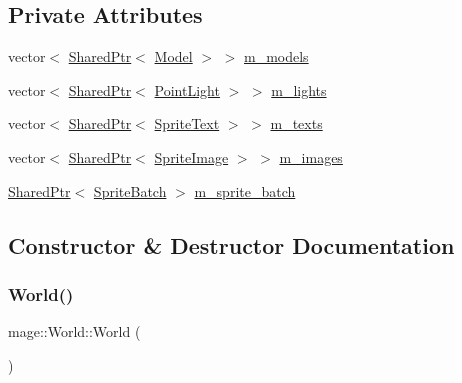 \subsection*{Private Attributes}
\begin{DoxyCompactItemize}
\item 
vector$<$ \hyperlink{namespacemage_a1e01ae66713838a7a67d30e44c67703e}{Shared\+Ptr}$<$ \hyperlink{classmage_1_1_model}{Model} $>$ $>$ \hyperlink{classmage_1_1_world_ad69d681d960e32f62800bfcfa88d7737}{m\+\_\+models}
\item 
vector$<$ \hyperlink{namespacemage_a1e01ae66713838a7a67d30e44c67703e}{Shared\+Ptr}$<$ \hyperlink{classmage_1_1_point_light}{Point\+Light} $>$ $>$ \hyperlink{classmage_1_1_world_a781af9ce8b1e03c5c606e3523323005b}{m\+\_\+lights}
\item 
vector$<$ \hyperlink{namespacemage_a1e01ae66713838a7a67d30e44c67703e}{Shared\+Ptr}$<$ \hyperlink{classmage_1_1_sprite_text}{Sprite\+Text} $>$ $>$ \hyperlink{classmage_1_1_world_a38e19c4c5caf02633f406ecfd04a2e4d}{m\+\_\+texts}
\item 
vector$<$ \hyperlink{namespacemage_a1e01ae66713838a7a67d30e44c67703e}{Shared\+Ptr}$<$ \hyperlink{classmage_1_1_sprite_image}{Sprite\+Image} $>$ $>$ \hyperlink{classmage_1_1_world_a8c0f2183e71d368824bab701713c5792}{m\+\_\+images}
\item 
\hyperlink{namespacemage_a1e01ae66713838a7a67d30e44c67703e}{Shared\+Ptr}$<$ \hyperlink{classmage_1_1_sprite_batch}{Sprite\+Batch} $>$ \hyperlink{classmage_1_1_world_abb5d26cbfbd7b5792a53359b823c9f37}{m\+\_\+sprite\+\_\+batch}
\end{DoxyCompactItemize}


\subsection{Constructor \& Destructor Documentation}
\hypertarget{classmage_1_1_world_a4b3883a575dcfb8c1f542ecb5938ddc5}{}\label{classmage_1_1_world_a4b3883a575dcfb8c1f542ecb5938ddc5} 
\subsubsection{\texorpdfstring{World()}{World()}\hspace{0.1cm}{\footnotesize\ttfamily [1/3]}}
{\footnotesize\ttfamily mage\+::\+World\+::\+World (\begin{DoxyParamCaption}{ }\end{DoxyParamCaption})}

